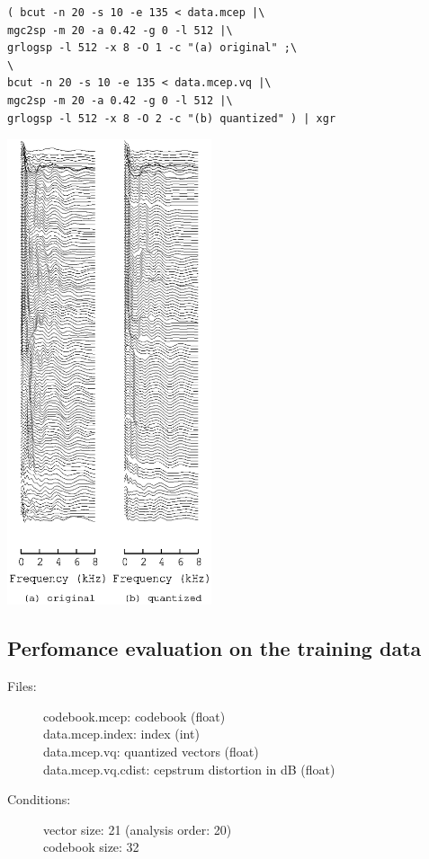 \documentclass[a4paper]{article}
\begin{document}
\begin{verbatim}
( bcut -n 20 -s 10 -e 135 < data.mcep |\
mgc2sp -m 20 -a 0.42 -g 0 -l 512 |\
grlogsp -l 512 -x 8 -O 1 -c "(a) original" ;\
\
bcut -n 20 -s 10 -e 135 < data.mcep.vq |\
mgc2sp -m 20 -a 0.42 -g 0 -l 512 |\
grlogsp -l 512 -x 8 -O 2 -c "(b) quantized" ) | xgr
\end{verbatim}

\includegraphics[width=6cm]{data.mcep.vq.grlogsp.eps}

\subsection{Perfomance evaluation on the training data}

\begin{description}
\item[Files:]
   codebook.mcep: codebook (float)\\
   data.mcep.index: index (int)\\
   data.mcep.vq: quantized vectors (float)\\
   data.mcep.vq.cdist: cepstrum distortion in dB (float)
\item[Conditions:]
   vector size: 21 (analysis order: 20)\\
   codebook size: 32
\end{description}
\end{document}
